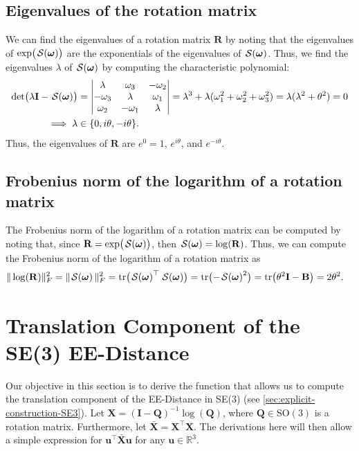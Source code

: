 \subsection{Eigenvalues of the rotation matrix}
We can find the eigenvalues of a rotation matrix $\mathbf{R}$ by noting that the eigenvalues of $\exp\bigl(\SL[\boldsymbol{\omega}]\bigr)$ are the exponentials of the eigenvalues of $\SL[\boldsymbol{\omega}]$. Thus, we find the eigenvalues $\lambda$ of $\SL[\boldsymbol{\omega}]$ by computing the characteristic polynomial:
\begin{align}
    \det\bigl(\lambda\mathbf{I} - \SL[\boldsymbol{\omega}]\bigr)&=\begin{vmatrix}
        \lambda & \omega_3 & -\omega_2\\
        -\omega_3 & \lambda & \omega_1\\
        \omega_2 & -\omega_1 & \lambda
    \end{vmatrix} = \lambda^3 + \lambda(\omega_1^2 + \omega_2^2 + \omega_3^2) = \lambda(\lambda^2 + \theta^2)=0\\
    \implies \lambda&\in\{0, i\theta, -i\theta\}.
\end{align}
Thus, the eigenvalues of $\mathbf{R}$ are $e^0=1$, $e^{i\theta}$, and $e^{-i\theta}$.

\subsection{Frobenius norm of the logarithm of a rotation matrix}
The Frobenius norm of the logarithm of a rotation matrix can be computed by noting that, since $\mathbf{R} = \exp\bigl(\SL[\boldsymbol{\omega}]\bigr)$, then $\SL[\boldsymbol{\omega}] = \log(\mathbf{R})$. Thus, we can compute the Frobenius norm of the logarithm of a rotation matrix as
\begin{align}
    \|\log(\mathbf{R})\|_F^2=\|\SL[\boldsymbol{\omega}]\|_F^2 &= \tr\bigl(\SL[\boldsymbol{\omega}]^\top\SL[\boldsymbol{\omega}]\bigr) = \tr\bigl(-\SL[\boldsymbol{\omega}]^2\bigr) = \tr\bigl(\theta^2\mathbf{I} - \mathbf{B}\bigr) = 2\theta^2.
\end{align}

\section{Translation Component of the SE(3) EE-Distance}\label{app:translation-component-SE3}
Our objective in this section is to derive the function that allows us to compute the translation component of the EE-Distance in SE(3) (see \cref{sec:explicit-construction-SE3}). Let $\mathbf{X}=(\mathbf{I} - \mathbf{Q})^{-1}\log(\mathbf{Q})$, where $\mathbf{Q}\in\text{SO}(3)$ is a rotation matrix. Furthermore, let $\bar{\mathbf{X}}=\mathbf{X}^\top\mathbf{X}$. The derivations here will then allow a simple expression for $\mathbf{u}^\top\bar{\mathbf{X}}\mathbf{u}$ for any $\mathbf{u}\in\mathbb{R}^3$.

